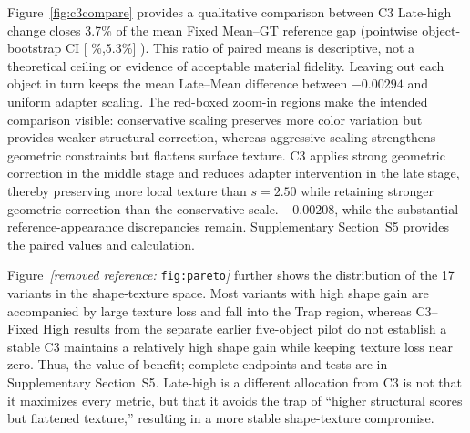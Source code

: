 \documentclass[times,twocolumn,final]{elsarticle}
\providecommand{\DIFadd}[1]{{\protect\color{blue} \sf #1}} %
\providecommand{\DIFdel}[1]{{\protect\color{red} \scriptsize #1}} %
\providecommand{\DIFaddbegin}{} %
\providecommand{\DIFaddend}{} %
\providecommand{\DIFdelbegin}{} %
\providecommand{\DIFdelend}{} %
\begin{document}
\DIFdel{Figure~\ref{fig:c3compare} provides a qualitative comparison between C3 }\DIFdelend \DIFaddbegin \DIFadd{Late-high change closes 3.7\% of the mean Fixed Mean--GT reference gap (pointwise object-bootstrap CI }[\DIFadd{2.3\%,5.3\%}]\DIFadd{). This ratio of paired means is descriptive, not a theoretical ceiling or evidence of acceptable material fidelity. Leaving out each object in turn keeps the mean Late--Mean difference between $-0.00294$ }\DIFaddend and \DIFdelbegin \DIFdel{uniform adapter scaling. The red-boxed zoom-in regions make the intended comparison visible: conservative scaling preserves more color variation but provides weaker structural correction, whereas aggressive scaling strengthens geometric constraints but flattens surface texture. C3 applies strong geometric correction in the middle stage and reduces adapter intervention in the late stage, thereby preserving more local texture than $s = 2.50$ while retaining stronger geometric correction than the conservative scale. }\DIFdelend \DIFaddbegin \DIFadd{$-0.00208$, while the substantial reference-appearance discrepancies remain. Supplementary Section~S5 provides the paired values and calculation.
}\DIFaddend

\DIFdelbegin %

\DIFdel{Figure~\textit{[removed reference: }\texttt{fig:pareto}\textit{]} further shows the distribution of the 17 variants in the shape-texture space. Most variants with high shape gain are accompanied by large texture loss and fall into the Trap region, whereas }\DIFdelend \DIFaddbegin \DIFadd{C3--Fixed High results from the separate earlier five-object pilot do not establish a stable }\DIFaddend C3 \DIFdelbegin \DIFdel{maintains a relatively high shape gain while keeping texture loss near zero. Thus, the value of }\DIFdelend \DIFaddbegin \DIFadd{benefit; complete endpoints and tests are in Supplementary Section~S5. Late-high is a different allocation from }\DIFaddend C3\DIFdelbegin \DIFdel{is not that it maximizes every metric, but that it avoids the trap of ``higher structural scores but flattened texture,'' resulting in a more stable shape-texture compromise}\DIFdelend .
\end{document}
